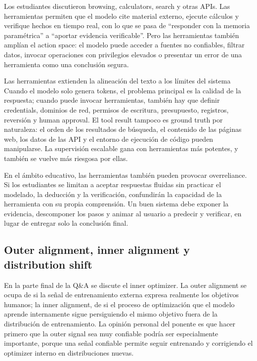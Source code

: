 Los estudiantes discutieron browsing, calculators, search y otras APIs. Las herramientas permiten que el modelo cite material externo, ejecute cálculos y verifique hechos en tiempo real, con lo que se pasa de ``responder con la memoria paramétrica'' a ``aportar evidencia verificable''. Pero las herramientas también amplían el action space: el modelo puede acceder a fuentes no confiables, filtrar datos, invocar operaciones con privilegios elevados o presentar un error de una herramienta como una conclusión segura.

\begin{knowledgebox}{Las herramientas extienden la alineación del texto a los límites del sistema}
Cuando el modelo solo genera tokens, el problema principal es la calidad de la respuesta; cuando puede invocar herramientas, también hay que definir credentials, dominios de red, permisos de escritura, presupuesto, registros, reversión y human approval. El tool result tampoco es ground truth por naturaleza: el orden de los resultados de búsqueda, el contenido de las páginas web, los datos de las API y el entorno de ejecución de código pueden manipularse. La supervisión escalable gana con herramientas más potentes, y también se vuelve más riesgosa por ellas.
\end{knowledgebox}

En el ámbito educativo, las herramientas también pueden provocar overreliance. Si los estudiantes se limitan a aceptar respuestas fluidas sin practicar el modelado, la deducción y la verificación, confundirán la capacidad de la herramienta con su propia comprensión. Un buen sistema debe exponer la evidencia, descomponer los pasos y animar al usuario a predecir y verificar, en lugar de entregar solo la conclusión final.

\subsection{Outer alignment, inner alignment y distribution shift}

En la parte final de la Q\&A se discute el inner optimizer. La outer alignment se ocupa de si la señal de entrenamiento externa expresa realmente los objetivos humanos; la inner alignment, de si el proceso de optimización que el modelo aprende internamente sigue persiguiendo el mismo objetivo fuera de la distribución de entrenamiento. La opinión personal del ponente es que hacer primero que la outer signal sea muy confiable podría ser especialmente importante, porque una señal confiable permite seguir entrenando y corrigiendo el optimizer interno en distribuciones nuevas.

